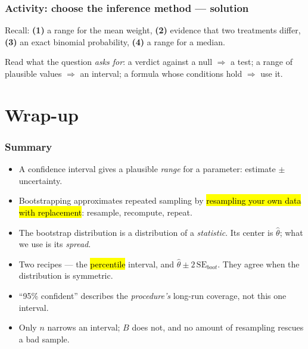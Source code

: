 \documentclass[slidestop,compress,mathserif]{beamer}
\begin{document}
\begin{frame}
\frametitle{Activity: choose the inference method --- solution}

{\small Recall: \textbf{(1)} a range for the mean weight, \textbf{(2)} evidence that two treatments differ, \textbf{(3)} an exact binomial probability, \textbf{(4)} a range for a median.}


\vspace{0.2em}
{\small Read what the question \emph{asks for}: a verdict against a null $\Rightarrow$ a test; a range of plausible values $\Rightarrow$ an interval; a formula whose conditions hold $\Rightarrow$ use it.}

\end{frame}

\section{Wrap-up}
\begin{frame}
\frametitle{Summary}

\begin{itemize}
\item A confidence interval gives a plausible \emph{range} for a parameter: estimate $\pm$ uncertainty.
\item Bootstrapping approximates repeated sampling by \hl{resampling your own data with replacement}: resample, recompute, repeat.
\item The bootstrap distribution is a distribution of a \emph{statistic}. Its center is $\hat\theta$; what we use is its \emph{spread}.
\item Two recipes --- the \hl{percentile} interval, and $\hat\theta \pm 2\,\mathrm{SE}_{boot}$. They agree when the distribution is symmetric.
\item ``95\% confident'' describes the \emph{procedure's} long-run coverage, not this one interval.
\item Only $n$ narrows an interval; $B$ does not, and no amount of resampling rescues a bad sample.
\end{itemize}

\end{frame}
\end{document}
